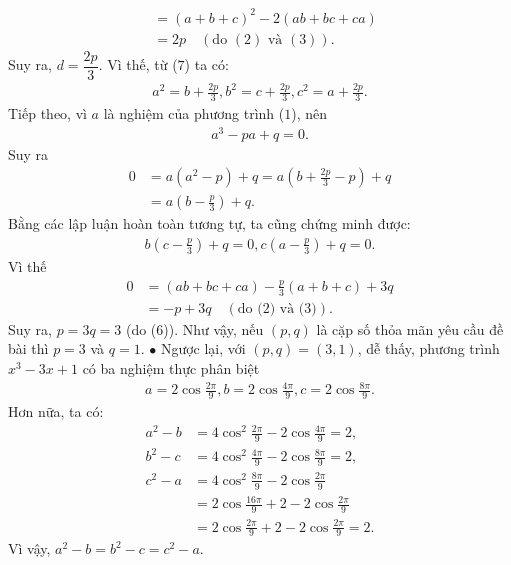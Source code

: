 \begin{multicols}{2}
\begin{align*}
		&= {\left( {a + b + c} \right)^2} - 2\left( {ab + bc + ca} \right)\\[-0.5ex]
		&= 2p \quad({\text{do }}(2){\text{ và }}(3)).
	\end{align*}
	Suy ra, $d = \dfrac{{2p}}{3}$. Vì thế, từ ($7$) ta có:
	\begin{align*}
		{a^2} = b + \frac{{2p}}{3}, {b^2} = c + \frac{{2p}}{3}, {c^2} = a + \frac{{2p}}{3}.
	\end{align*}
	Tiếp theo, vì $a$ là nghiệm của phương trình ($1$), nên
	\begin{align*}
		{a^3} - pa + q = 0.
	\end{align*}
	Suy ra
	\begin{align*}
		0 &= a\left( {{a^2} - p} \right) + q = a\left( {b + \frac{{2p}}{3} - p} \right) + q \\
		&= a\left( {b - \frac{p}{3}} \right) + q.
	\end{align*}
	Bằng các lập luận hoàn toàn tương tự, ta cũng chứng minh được:
	\begin{align*}
		b\left( {c - \frac{p}{3}} \right) + q = 0, c\left( {a - \frac{p}{3}} \right) + q = 0.
	\end{align*}
	Vì thế
	\begin{align*}
		0 &= \left( {ab + bc + ca} \right) - \frac{p}{3}\left( {a + b + c} \right) + 3q \\
		&=  - p + 3q \quad(\text{do ($2$) và ($3$)}).
	\end{align*}
	Suy ra, $p = 3q = 3$ (do ($6$)).
	\vskip 0.05cm
	Như vậy, nếu $(p, q)$ là cặp số thỏa mãn yêu cầu đề bài thì $p = 3$ và $q = 1$.
	\vskip 0.05cm
	$\bullet$ Ngược lại, với $(p, q) = (3, 1)$, dễ thấy, phương trình $x^3 - 3x + 1$ có ba nghiệm thực phân biệt
	\begin{align*}
		a = 2\cos \frac{{2\pi }}{9}, b = 2\cos \frac{{4\pi }}{9}, c = 2\cos \frac{{8\pi }}{9}.
	\end{align*}
	Hơn nữa, ta có:
	\begin{align*}
		{a^2} - b &= 4{\cos ^2}\frac{{2\pi }}{9} - 2\cos \frac{{4\pi }}{9} = 2,\\
		{b^2} - c &= 4{\cos ^2}\frac{{4\pi }}{9} - 2\cos \frac{{8\pi }}{9} = 2,\\
		{c^2} - a &= 4{\cos ^2}\frac{{8\pi }}{9} - 2\cos \frac{{2\pi }}{9} \\
		&= 2\cos \frac{{16\pi }}{9} + 2 - 2\cos \frac{{2\pi }}{9} \\
		&= 2\cos \frac{{2\pi }}{9} + 2 - 2\cos \frac{{2\pi }}{9} = 2.
	\end{align*}
	Vì vậy, ${a^2} - b = {b^2} - c = {c^2} - a$.

\end{multicols}
